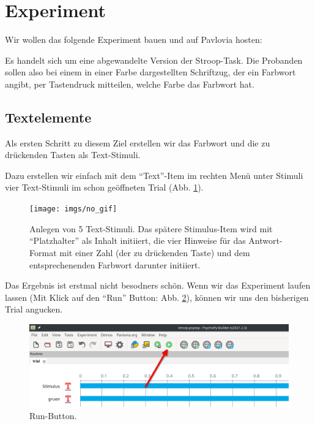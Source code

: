 \documentclass[
]{book}
\begin{document}
\hypertarget{experiment}{%
\section{Experiment}\label{experiment}}

Wir wollen das folgende Experiment bauen und auf Pavlovia hosten:

Es handelt sich um eine abgewandelte Version der Stroop-Task. Die Probanden sollen also bei einem in einer Farbe dargestellten Schriftzug, der ein Farbwort angibt, per Tastendruck mitteilen, welche Farbe das Farbwort hat.

\hypertarget{textelemente}{%
\subsection{Textelemente}\label{textelemente}}

Als ersten Schritt zu diesem Ziel erstellen wir das Farbwort und die zu drückenden Tasten als Text-Stimuli.

Dazu erstellen wir einfach mit dem ``Text''-Item im rechten Menü unter Stimuli vier Text-Stimuli im schon geöffneten Trial (Abb. \ref{fig:Textstimuli}).



\begin{figure}

{\centering \texttt{[image: imgs/no\_gif]} 

}

\caption{Anlegen von 5 Text-Stimuli. Das spätere Stimulus-Item wird mit ``Platzhalter'' als Inhalt initiiert, die vier Hinweise für das Antwort-Format mit einer Zahl (der zu drückenden Taste) und dem entsprechenenden Farbwort darunter initiiert.}\label{fig:Textstimuli}
\end{figure}

Das Ergebnis ist erstmal nicht besodners schön. Wenn wir das Experiment laufen lassen (Mit Klick auf den ``Run'' Button: Abb. \ref{fig:Run}), können wir uns den bisherigen Trial angucken.



\begin{figure}

{\centering \includegraphics[width=.8\textwidth]{imgs/Run} 

}

\caption{Run-Button.}\label{fig:Run}
\end{figure}
\end{document}
